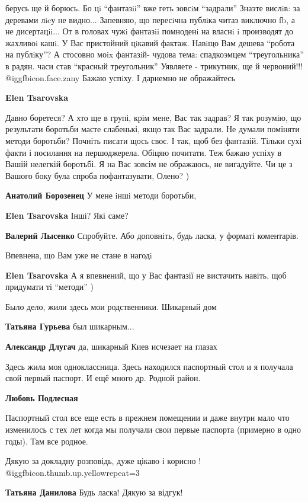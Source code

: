 \begin{itemize}
\begin{itemize}
\begin{itemize}
берусь ще й борюсь. Бо цi \enquote{фантазii} вже геть зовсiм \enquote{задрали}
Знаэте вислiв: за деревами лicу не видно... Запевняю, що пересiчна публiка
читаэ виключно fb, а не дисертацii... От в головах чужi фантазii помноденi на
власнi i производят до жахливоi кашi. У Вас пристойний цiкавий фактаж. Навiщо
Вам дешева \enquote{робота на публiку}? А стосовно моix фантазiй- чудова тема:
спадкоэмцем \enquote{треугольника} в радян. часи став \enquote{красный
треугольник} Уявляете - трикутник, ще й червоний!!! @igg{fbicon.face.zany} Бажаю успiху. I дарнемно
не ображайтесь

\textbf{Elen Tsarovska} 

Давно боретеся? А хто ще в групі, крім мене, Вас так задрав? Я так розумію, що
результати боротьби маєте слабенькі, якщо так Вас задрали. Не думали поміняти
методи боротьби? Почніть писати щось своє. І так, щоб без фантазій. Тільки сухі
факти і посилання на першоджерела. Обіцяю почитати. Теж бажаю успіху в Вашій
нелегкій боротьбі. Я на Вас зовсім не ображаюсь, не вигадуйте. Чи це з Вашого
боку була спроба пофантазувати, Олено? )


\textbf{Анатолий Борозенец} У мене iншi методи боротьби,

\textbf{Elen Tsarovska} Інші? Які саме?
\end{itemize} %

\textbf{Валерий Лысенко} Спробуйте. Або доповніть, будь ласка, у форматі коментарів.

Впевнена, що Вам уже не стане в нагодi

\textbf{Elen Tsarovska} А я впевнений, що у Вас фантазії не вистачить навіть, щоб придумати ті \enquote{методи} )

\end{itemize} %

Было дело, жили здесь мои родственники. Шикарный дом

\begin{itemize} %
\textbf{Татьяна Гурьева} был шикарным...

\textbf{Александр Длугач} да, шикарный Киев исчезает на глазах
\end{itemize} %

Здесь
жила моя одноклассница. Здесь находился паспортный стол и я получала свой первый паспорт. И ещё много др. Родной район.

\textbf{Любовь Подлесная} 

Паспортный стол все еще есть в прежнем помещении и даже внутри мало что
изменилось с тех лет когда мы получали свои первые паспорта (примерно в одно
годы). Там все родное.


Дякую за докладну розповідь, дуже цікаво і корисно ! @igg{fbicon.thumb.up.yellow}{repeat=3} 

\textbf{Татьяна Данилова} Будь ласка! Дякую за відгук!

\end{itemize} %
